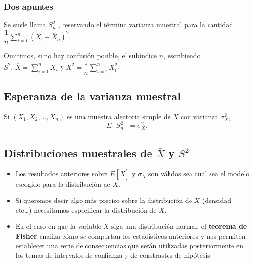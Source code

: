 \subsubsection{Dos apuntes}
\begin{tcolorbox}[colback=blue!5!white, colframe=blue!75!black, title=\textbf{En algunos textos en castellano:}]
  Se suele llama $S_n^2$ , reservando el término varianza muestral para la cantidad $\dfrac{1}{n}\sum_{i=1}^{n} \left( X_i-\overline{X}_n \right) ^2$. 
\end{tcolorbox}
\begin{tcolorbox}[colback=blue!5!white, colframe=blue!75!black, title=\textbf{En estas fórmulas:}]
  Omitimos, si no hay confusión posible, el subíndice $n$, escribiendo  $S^2,\, \overline{X}=\sum_{i=1}^{n} X_i$ y $\overline{X^2}=\dfrac{1}{n}\sum_{i=1}^{n} X_i^2$.
\end{tcolorbox}
\subsection{Esperanza de la varianza muestral}
\begin{tcolorbox}[colback=blue!5!white, colframe=blue!75!black, title=\textbf{Proposición}]
Si $(X_1,X_2,\dots,X_n)$ es una muestra aleatoria simple de $X$ con varianza  $\sigma_X^2$, \[
  E[S_n^2]=\sigma_X^2.
\] 
\end{tcolorbox}
\subsection{Distribuciones muestrales de $\overline{X}$ y  $S^2$}
\begin{tcolorbox}[colback=olive!5!white, colframe=olive!75!black, title=\textbf{Tened en cuenta}]
\begin{itemize}[label=\textbullet]
  \item Los resultados anteriores sobre $E[\overline{X}]$ y  $\sigma_{\overline{X}}$ son válidos sea cual sea el modelo escogido para la distribución de $X$.
  \item Si queremos decir algo más preciso sobre la distribución de  $\overline{X}$ (densidad, etc\dots) necesitamos especificar la distribución de $X$.
  \item En el caso en que la variable  $X$ siga una distribución normal, el  \textbf{teorema de Fisher} analiza cómo se comportan los estadísticos anteriores y nos permiten establecer una serie de consecuencias que serán utilizadas posteriormente en los temas de intervalos de confianza y de constrastes de hipótesis. 
\end{itemize}
\end{tcolorbox}
